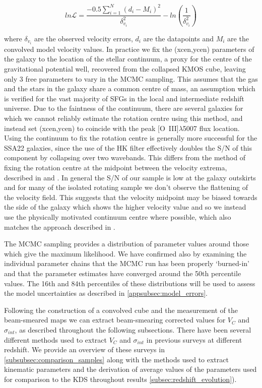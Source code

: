 \documentclass[fleqn,usenatbib]{mn2e}
\newcommand{\Lagr}{\mathcal{L}}
\begin{document}
\begin{equation}\label{eq:likelihood}
   ln\Lagr = \frac{-0.5\sum_{i=1}^{N}(d_{i} - M_{i})^{2}}{\delta_{v_{i}}^{2}} - ln\left(\frac{1}{\delta_{v_{i}}^{2}}\right)
\end{equation}

\noindent
where $\delta_{v_{i}}$ are the observed velocity errors, $d_{i}$ are the datapoints and $M_{i}$ are the convolved model velocity values.
In practice we fix the (xcen,ycen) parameters of the galaxy to the location of the stellar continuum, a proxy for the centre of the gravitational potential well, recovered from the collapsed KMOS cube, leaving only 3 free parameters to vary in the MCMC sampling.
This assumes that the gas and the stars in the galaxy share a common centre of mass, an assumption which is verified for the vast majority of SFGs in the local and intermediate redshift universe.
Due to the faintness of the continuum, there are several galaxies for which we cannot reliably estimate the rotation centre using this method, and instead set (xcen,ycen) to coincide with the peak [O~{\sc III}]$\lambda$5007 flux location.
Using the continuum to fix the rotation centre is generally more successful for the SSA22 galaxies, since the use of the HK filter effectively doubles the S/N of this component by collapsing over two wavebands.
This differs from the method of fixing the rotation centre at the midpoint between the velocity extrema, described in \cite{Wisnioski2015} and \cite{Rodrigues2016}.
In general the S/N of our sample is low at the galaxy outskirts and for many of the isolated rotating sample we don't observe the flattening of the velocity field.
This suggests that the velocity midpoint may be biased towards the side of the galaxy which shows the higher velocity value and so we instead use the physically motivated continuum centre where possible, which also matches the approach described in \cite{Harrison2017}.

The MCMC sampling provides a distribution of parameter values around those which give the maximum likelihood.
We have confirmed also by examining the individual parameter chains that the MCMC run has been properly `burned-in' and that the parameter estimates have converged around the 50th percentile values.
The 16th and 84th percentiles of these distributions will be used to assess the model uncertainties as described in \cref{appsubsec:model_errors}.

Following the construction of a convolved cube and the measurement of the beam-smeared maps we can extract beam-smearing corrected values for $V_{C}$ and $\sigma_{int}$, as described throughout the following subsections.
There have been several different methods used to extract $V_{C}$ and $\sigma_{int}$ in previous surveys at different redshift.
We provide an overview of these surveys in \cref{subsubsec:comparison_samples} along with the methods used to extract kinematic parameters and the derivation of average values of the parameters used for comparison to the KDS throughout results \cref{subsec:redshift_evolution}).
\end{document}
